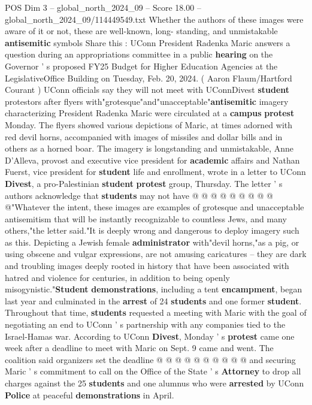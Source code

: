 \begin{textsample}{POS Dim 3 – global\_north\_2024\_09 – Score 18.00 – global\_north\_2024\_09/114449549.txt}  \label{ex:f3_pos_162}
Whether the authors of these images were aware of it or not, these are well-known, long- standing, and unmistakable \textbf{antisemitic} symbols Share this : UConn President Radenka Maric answers a question during an appropriations committee in a public \textbf{hearing} on the Governor ' s proposed FY25 Budget for Higher Education Agencies at the LegislativeOffice Building on Tuesday, Feb. 20, 2024. ( Aaron Flaum/Hartford Courant ) UConn officials say they will not meet with UConnDivest \textbf{student} protestors after flyers with"grotesque"and"unacceptable"\textbf{antisemitic} imagery characterizing President Radenka Maric were circulated at a \textbf{campus} \textbf{protest} Monday.
The flyers showed various depictions of Maric, at times adorned with red devil horns, accompanied with images of missiles and dollar bills and in others as a horned boar.
The imagery is longstanding and unmistakable, Anne D'Alleva, provost and executive vice president for \textbf{academic} affairs and Nathan Fuerst, vice president for \textbf{student} life and enrollment, wrote in a letter to UConn \textbf{Divest}, a pro-Palestinian \textbf{student} \textbf{protest} group, Thursday.
The letter ' s authors acknowledge that \textbf{students} may not have @ @ @ @ @ @ @ @ @ @"Whatever the intent, these images are examples of grotesque and unacceptable antisemitism that will be instantly recognizable to countless Jews, and many others,"the letter said."It is deeply wrong and dangerous to deploy imagery such as this.
Depicting a Jewish female \textbf{administrator} with"devil horns,"as a pig, or using obscene and vulgar expressions, are not amusing caricatures -- they are dark and troubling images deeply rooted in history that have been associated with hatred and violence for centuries, in addition to being openly misogynistic."\textbf{Student} \textbf{demonstrations}, including a tent \textbf{encampment}, began last year and culminated in the \textbf{arrest} of 24 \textbf{students} and one former \textbf{student}.
Throughout that time, \textbf{students} requested a meeting with Maric with the goal of negotiating an end to UConn ' s partnership with any companies tied to the Israel-Hamas war.
According to UConn \textbf{Divest}, Monday ' s \textbf{protest} came one week after a deadline to meet with Maric on Sept. 9 came and went.
The coalition said organizers set the deadline @ @ @ @ @ @ @ @ @ @ and securing Maric ' s commitment to call on the Office of the State ' s \textbf{Attorney} to drop all charges against the 25 \textbf{students} and one alumnus who were \textbf{arrested} by UConn \textbf{Police} at peaceful \textbf{demonstrations} in April.

\end{textsample}
